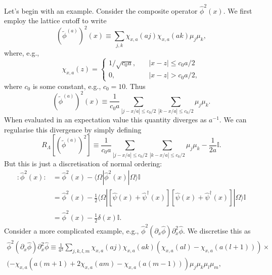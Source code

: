 \documentclass[prl,twocolumn,lengthcheck,superscriptaddress]{revtex4-1}
\theoremstyle{definition}
\theoremstyle{remark}
\begin{document}
Let's begin with an example. Consider the composite operator $\widehat{\phi}^2(x)$. We first employ the lattice cutoff to write
\begin{equation}
	(\widetilde{\phi}^{(a)})^2(x) \equiv  \sum_{j,k} \chi_{x,a}(aj)\chi_{x,a}(ak) \mu_j\mu_k,
\end{equation}
where, e.g.,
\begin{equation}
	\chi_{x,a}(z) = \begin{cases} 1/\sqrt{c_0a}, & \quad |x-z|\le c_0a/2 \\ 0, & \quad |x-z| > c_0a/2,\end{cases}
\end{equation}
where $c_0$ is some constant, e.g., $c_0 = 10$.
Thus
\begin{equation}
	(\widetilde{\phi}^{(a)})^2(x) \equiv \frac{1}{c_0 a} \sum_{|j-x/a|\le c_0/2}\sum_{|k-x/a|\le c_0/2} \mu_j\mu_k.
\end{equation}
When evaluated in an expectation value this quantity diverges as $a^{-1}$. We can regularise this divergence by simply defining
\begin{equation}
	R_\Lambda[(\widetilde{\phi}^{(a)})^2] \equiv \frac{1}{c_0 a} \sum_{|j-x/a|\le c_0/2}\sum_{|k-x/a|\le c_0/2} \mu_j\mu_k - \frac{1}{2a}\mathbb{I}. 
\end{equation}
But this is just a discretisation of normal ordering:
\begin{equation}
	\begin{split}
	{:}\widehat{\phi}^2(x){:} &= \widehat{\phi}^2(x) - \langle \Omega|\widehat{\phi}^2(x)|\Omega\rangle \mathbb{I}\\
	&= \widehat{\phi}^2(x) - \frac12\langle \Omega|[\widehat{\psi}(x)+\widehat{\psi}^\dag(x)][\widehat{\psi}(x)+\widehat{\psi}^\dag(x)]|\Omega\rangle \mathbb{I} \\
	&= \widehat{\phi}^2(x) - \frac12 \delta(x) \mathbb{I}.
	\end{split}
\end{equation}
Consider a more complicated example, e.g., $\widehat{\phi}^2(\partial_x\widehat{\phi}) \partial_x^2\widehat{\phi}$. We discretise this as 
\begin{equation}
	\begin{split}
	\widehat{\phi}^2(\partial_x\widehat{\phi}) \partial_x^2\widehat{\phi} \equiv  \frac{1}{a^{3}}\sum_{j,k,l,m} \chi_{x,a}(aj)\chi_{x,a}(ak)(\chi_{x,a}(al)-\chi_{x,a}(a(l+1)))\times \\ (-\chi_{x,a}(a(m+1)+ 2\chi_{x,a}(am)-\chi_{x,a}(a(m-1)) ) \mu_j\mu_k\mu_l\mu_m,
	\end{split}
\end{equation}
\end{document}
